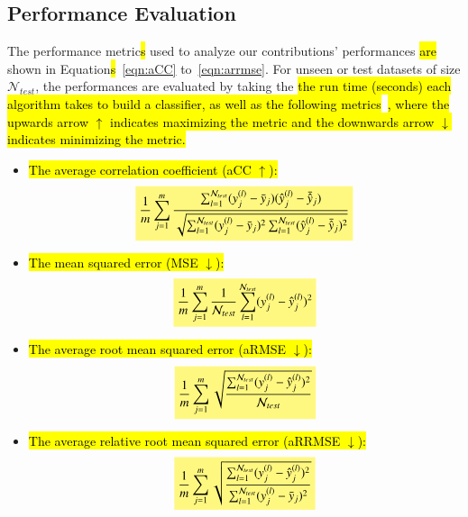 \documentclass[preprint,12pt]{elsarticle}
\newcommand{\highlight}[1]{%
  \colorbox{yellow!50}{$\displaystyle#1$}}
\begin{document}
\subsection{Performance Evaluation}\label{subsec:perfeval}
The performance metric\hl{s} used to analyze our contributions' performances  \hl{are} shown in Equation\hl{s}~\ref{eqn:aCC} to~\ref{eqn:arrmse}. For unseen or test datasets of size $\mathcal N_{test}$, the performances are evaluated by taking the  \hl{the run time (seconds) each algorithm takes to build a classifier, as well as the following metrics}~\cite{Borchani2015,Friedman2010}\hl{, where the upwards arrow $\uparrow$ indicates maximizing the metric and the downwards arrow $\downarrow$ indicates minimizing the metric.}

\begin{itemize}
\item \hl{The average correlation coefficient (aCC $\uparrow$):}
\begin{eqnarray}
\highlight{\frac{1}{m} \sum_{j = 1}^m \frac{\sum_{l = 1}^{\mathcal N_{test}} (y_j^{(l)} - \bar{y}_j)(\hat{y}_j^{(l)} - \bar{\hat{y}}_j)}{\sqrt{\sum_{l = 1}^{\mathcal N_{test}} (y_j^{(l)} - \bar{y}_j)^2 \sum_{l = 1}^{\mathcal N_{test}} (\hat{y}_j^{(l)} - \bar{\hat{y}}_j)^2}}}
\label{eqn:aCC}
\end{eqnarray}

\item \hl{The mean squared error (MSE $\downarrow$):}
\begin{eqnarray}
\highlight{\frac{1}{m} \sum_{j = 1}^m \frac{1}{\mathcal N_{test}} \sum_{l = 1}^{\mathcal N_{test}} (y_j^{(l)} - \hat{y}^{(l)}_j)^2}
\label{eqn:MSE}
\end{eqnarray}

\item \hl{The average root mean squared error (aRMSE $\downarrow$):}
\begin{eqnarray}
\highlight{\frac{1}{m} \sum_{j = 1}^m \sqrt{\frac{\sum_{l = 1}^{\mathcal N_{test}} (y_j^{(l)} - \hat{y}^{(l)}_j)^2}{\mathcal N_{test}}}}
\label{eqn:armse}
\end{eqnarray}

\item \hl{The average relative root mean squared error (aRRMSE $\downarrow$):}
\begin{eqnarray}
\highlight{\frac{1}{m} \sum_{j = 1}^m \sqrt{\frac{\sum_{l = 1}^{\mathcal N_{test}} (y_j^{(l)} - \hat{y}_j^{(l)})^2}{\sum_{l = 1}^{\mathcal N_{test}} (y_j^{(l)} - \bar{y}_j)^2}}}
\label{eqn:arrmse}
\end{eqnarray}
\end{itemize}
\end{document}
